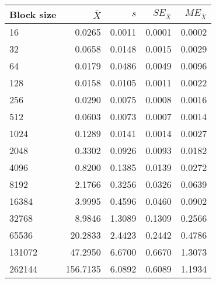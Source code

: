 \begin{tabular}{lrrrr}\toprule
{\small Block size} & $\bar{X}$ & $s$ & $SE_{\bar{X}}$ & $ME_{\bar{X}}$ \\\midrule
16 & 0.0265 & 0.0011 & 0.0001 & 0.0002\\
32 & 0.0658 & 0.0148 & 0.0015 & 0.0029\\
64 & 0.0179 & 0.0486 & 0.0049 & 0.0096\\
128 & 0.0158 & 0.0105 & 0.0011 & 0.0022\\
256 & 0.0290 & 0.0075 & 0.0008 & 0.0016\\
512 & 0.0603 & 0.0073 & 0.0007 & 0.0014\\
1024 & 0.1289 & 0.0141 & 0.0014 & 0.0027\\
2048 & 0.3302 & 0.0926 & 0.0093 & 0.0182\\
4096 & 0.8200 & 0.1385 & 0.0139 & 0.0272\\
8192 & 2.1766 & 0.3256 & 0.0326 & 0.0639\\
16384 & 3.9995 & 0.4596 & 0.0460 & 0.0902\\
32768 & 8.9846 & 1.3089 & 0.1309 & 0.2566\\
65536 & 20.2833 & 2.4423 & 0.2442 & 0.4786\\
131072 & 47.2950 & 6.6700 & 0.6670 & 1.3073\\
262144 & 156.7135 & 6.0892 & 0.6089 & 1.1934\\
\bottomrule
\end{tabular}
